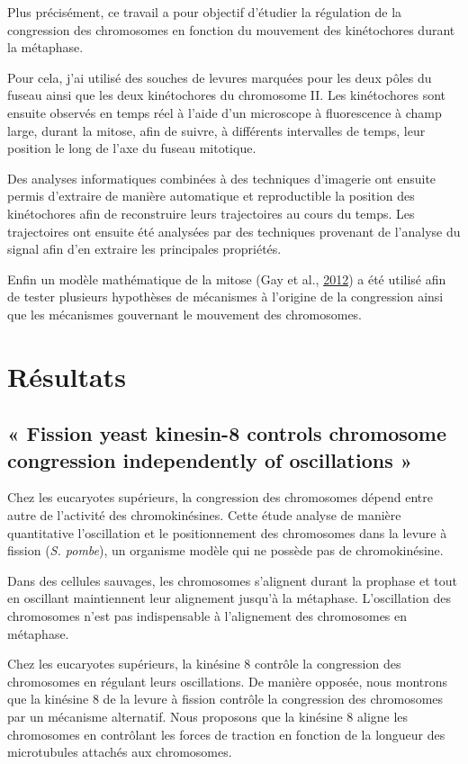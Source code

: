 \documentclass[12pt,a4paper,twoside,openright]{book}
\begin{document}
Plus précisément, ce travail a pour objectif d'étudier la régulation de
la congression des chromosomes en fonction du mouvement des kinétochores
durant la métaphase.

Pour cela, j'ai utilisé des souches de levures marquées pour les deux
pôles du fuseau ainsi que les deux kinétochores du chromosome II. Les
kinétochores sont ensuite observés en temps réel à l'aide d'un
microscope à fluorescence à champ large, durant la mitose, afin de
suivre, à différents intervalles de temps, leur position le long de
l'axe du fuseau mitotique.

Des analyses informatiques combinées à des techniques d'imagerie ont
ensuite permis d'extraire de manière automatique et reproductible la
position des kinétochores afin de reconstruire leurs trajectoires au
cours du temps. Les trajectoires ont ensuite été analysées par des
techniques provenant de l'analyse du signal afin d'en extraire les
principales propriétés.

Enfin un modèle mathématique de la mitose (Gay et al.,
\hyperref[ref-Gay2012a]{2012}) a été utilisé afin de tester plusieurs
hypothèses de mécanismes à l'origine de la congression ainsi que les
mécanismes gouvernant le mouvement des chromosomes.

\chapter{Résultats}\label{ruxe9sultats}

\section{« Fission yeast kinesin-8 controls chromosome congression
independently of oscillations »}\label{sec:article}

Chez les eucaryotes supérieurs, la congression des chromosomes dépend
entre autre de l'activité des chromokinésines. Cette étude analyse de
manière quantitative l'oscillation et le positionnement des chromosomes
dans la levure à fission (\emph{S. pombe}), un organisme modèle qui ne
possède pas de chromokinésine.

Dans des cellules sauvages, les chromosomes s'alignent durant la
prophase et tout en oscillant maintiennent leur alignement jusqu'à la
métaphase. L'oscillation des chromosomes n'est pas indispensable à
l'alignement des chromosomes en métaphase.

Chez les eucaryotes supérieurs, la kinésine 8 contrôle la congression
des chromosomes en régulant leurs oscillations. De manière opposée, nous
montrons que la kinésine 8 de la levure à fission contrôle la
congression des chromosomes par un mécanisme alternatif. Nous proposons
que la kinésine 8 aligne les chromosomes en contrôlant les forces de
traction en fonction de la longueur des microtubules attachés aux
chromosomes.
\end{document}
